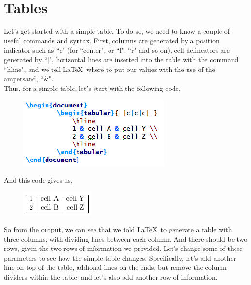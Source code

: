 \documentclass[11pt]{article}
\newcommand{\forceindent}{\leavevmode{\parindent=1.5em\indent}} %
\begin{document}
\newpage 

\section{Tables}

\forceindent Let's get started with a simple table. To do so, we need to know a couple of useful commands and syntax. First, columns are generated by a position indicator such as ``c" (for ``center", or ``l", ``r" and so on), cell delineators are generated by ``$|$", horizontal lines are inserted into the table with the command ``hline", and we tell \LaTeX\ where to put our values with the use of the ampersand, ``\&". \\

Thus, for a simple table, let's start with the following code,

\begin{figure}[!h]
	\includegraphics[scale=.5]{CODE1} \\ %
\end{figure}

And this code gives us,

\begin{figure}[!h]
	\includegraphics[scale=.6]{OUT1} \\ %
	\centering
\end{figure}

So from the output, we can see that we told \LaTeX\ to generate a table with three columns, with dividing lines between each column. And there should be two rows, given the two rows of information we provided. Let's change some of these parameters to see how the simple table changes. Specifically, let's add another line on top of the table, addional lines on the ends, but remove the column dividers within the table, and let's also add another row of information. \\
\end{document}
